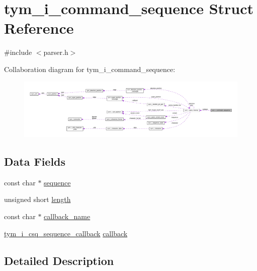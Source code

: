 \hypertarget{structtym__i__command__sequence}{}\section{tym\+\_\+i\+\_\+command\+\_\+sequence Struct Reference}
\label{structtym__i__command__sequence}


{\ttfamily \#include $<$parser.\+h$>$}



Collaboration diagram for tym\+\_\+i\+\_\+command\+\_\+sequence\+:
\nopagebreak
\begin{figure}[H]
\begin{center}
\leavevmode
\includegraphics[width=350pt]{structtym__i__command__sequence__coll__graph}
\end{center}
\end{figure}
\subsection*{Data Fields}
\begin{DoxyCompactItemize}
\item 
const char $\ast$ \hyperlink{structtym__i__command__sequence_a97eb218996497c02f77662293e3a617c}{sequence}
\item 
unsigned short \hyperlink{structtym__i__command__sequence_a26469eac6daf5799c118900e051c8def}{length}
\item 
const char $\ast$ \hyperlink{structtym__i__command__sequence_ac75a4e69eaf4c215b60f5d9d088f0583}{callback\+\_\+name}
\item 
\hyperlink{parser_8h_a647b0f7eb717ad806b441ebfdad60e30}{tym\+\_\+i\+\_\+csq\+\_\+sequence\+\_\+callback} \hyperlink{structtym__i__command__sequence_ae01318864f1edc1d61a6bed1e73773fa}{callback}
\end{DoxyCompactItemize}


\subsection{Detailed Description}


